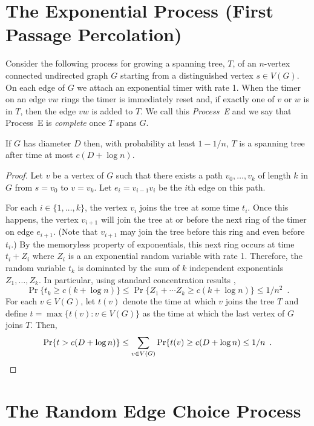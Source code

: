 \documentclass{patmorin}
\begin{document}
\section{The Exponential Process (First Passage Percolation)}

Consider the following process for growing a spanning tree, $T$, of an
$n$-vertex connected undirected graph $G$ starting from a distinguished
vertex $s\in V(G)$.  On each edge of $G$ we attach an exponential timer
with rate 1. When the timer on an edge $vw$ rings the timer is immediately
reset and, if exactly one of $v$ or $w$ is in $T$, then the edge $vw$
is added to $T$.  We call this \emph{Process~E} and we say that Process~E
is \emph{complete} once $T$ spans $G$.

\begin{lem}
  If $G$ has diameter $D$ then, with probability at least $1-1/n$, $T$
  is a spanning tree after time at most $c(D+\log n)$.
\end{lem}


\begin{proof}
  Let $v$ be a vertex of $G$ such that there exists a path
  $v_0,\ldots,v_k$ of length $k$ in $G$ from $s=v_0$ to $v=v_k$.
  Let $e_i=v_{i-1}v_i$ be the $i$th edge on this path.

  For each $i\in\{1,\ldots,k\}$, the vertex $v_i$ joins the tree at some
  time $t_i$.  Once this happens, the vertex $v_{i+1}$ will join the tree
  at or before the next ring of the timer on edge $e_{i+1}$.  (Note that
  $v_{i+1}$ may join the tree before this ring and even before $t_i$.)
  By the memoryless property of exponentials, this next ring occurs at
  time $t_i+Z_i$ where $Z_i$ is a an exponential random variable with
  rate 1.  Therefore, the random variable $t_k$ is dominated by the sum
  of $k$ independent exponentials $Z_1,\ldots,Z_k$.
  In particular, using standard concentration results \cite{X},
  \[
      \Pr\{t_k\ge c(k+\log n)\} \le \Pr\{Z_1+\cdots Z_k\ge c(k+\log n)\} \le 1/n^2 \enspace .
  \]
  For each $v\in V(G)$, let $t(v)$ denote the time at which $v$ joins
  the tree $T$ and define $t=\max\{t(v):v\in V(G)\}$
  as the time at which the last vertex of $G$ joins 
  $T$.  Then,
  \[
      \Pr\{t> c(D+\log n)\} \le \sum_{v\in V(G)}\Pr\{t(v) \ge c(D+\log n)     
       \le 1/n \enspace . \qedhere
  \]
\end{proof}

\section{The Random Edge Choice Process}
\end{document}
